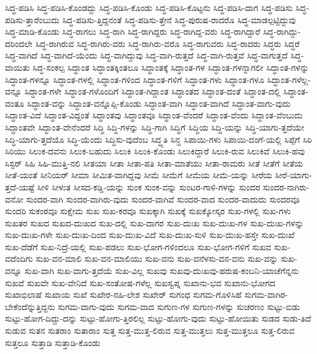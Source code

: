 {ಸಿದ್ಧ-ಪಡಿಸಿ
ಸಿದ್ಧ-ಪಡಿಸಿ-ಕೊಂಡದ್ದು
ಸಿದ್ಧ-ಪಡಿಸಿ-ಕೊಂಡು
ಸಿದ್ಧ-ಪಡಿಸಿ-ಕೊಟ್ಟನು
ಸಿದ್ಧ-ಪಡಿಸಿ-ದಾಗ
ಸಿದ್ಧ-ಪಡಿಸು
ಸಿದ್ಧ-ಪಡಿಸು-ತ್ತಾರೆಂಬುದು
ಸಿದ್ಧ-ಪಡಿಸು-ತ್ತಿದ್ದನಂತೆ
ಸಿದ್ಧ-ಪಡಿಸು-ತ್ತೇನೆ
ಸಿದ್ಧ-ಪುರುಷ-ರಾದರೊ
ಸಿದ್ಧ-ಮಾಡಲ್ಪಟ್ಟಿದ್ದುವು
ಸಿದ್ಧ-ಮಾಡಿ-ಕೊಂಡು
ಸಿದ್ಧ-ರಾಗಲು
ಸಿದ್ಧ-ರಾಗಿ
ಸಿದ್ಧ-ರಾಗಿದ್ದರು
ಸಿದ್ಧ-ರಾಗಿದ್ದ-ವರು
ಸಿದ್ಧ-ರಾಗಿದ್ದಾರೆ
ಸಿದ್ಧ-ರಾಗಿದ್ದು-ದರಿಂದಲೇ
ಸಿದ್ಧ-ರಾಗಿರುವ
ಸಿದ್ಧ-ರಾಗಿರು-ವರು
ಸಿದ್ಧ-ರಾಗಿರು-ವರೊ
ಸಿದ್ಧ-ರಾಗುವರು
ಸಿದ್ಧ-ರಾದರು
ಸಿದ್ಧರು
ಸಿದ್ಧರೆ
ಸಿದ್ಧ-ವಾಗಿದೆ
ಸಿದ್ಧ-ವಾಗಿದೆ-ಯೆಂದು
ಸಿದ್ಧ-ವಾಗಿದ್ದುವು
ಸಿದ್ಧ-ವಾಗಿ-ರುತ್ತದೆ
ಸಿದ್ಧ-ವಾಗಿ-ರುತ್ತವೆ
ಸಿದ್ಧ-ವಾಗುತ್ತದೆ
ಸಿದ್ಧ-ವಾಯಿತು
ಸಿದ್ಧ-ಸಂಕಲ್ಪ
ಸಿದ್ಧಾಂತ
ಸಿದ್ಧಾಂತಕ್ಕಿಂತಲೂ
ಸಿದ್ಧಾಂತಕ್ಕೆ
ಸಿದ್ಧಾಂತ-ಗಳ
ಸಿದ್ಧಾಂತ-ಗಳನ್ನಾಗಲೀ
ಸಿದ್ಧಾಂತ-ಗಳನ್ನು
ಸಿದ್ಧಾಂತ-ಗಳನ್ನೂ
ಸಿದ್ಧಾಂತ-ಗಳಲ್ಲಿ
ಸಿದ್ಧಾಂತ-ಗಳಿಂದ
ಸಿದ್ಧಾಂತ-ಗಳಿಗೆ
ಸಿದ್ಧಾಂತ-ಗಳು
ಸಿದ್ಧಾಂತ-ಗಳೂ
ಸಿದ್ಧಾಂತ-ಗಳೆಲ್ಲ-ವನ್ನೂ
ಸಿದ್ಧಾಂತ-ಗಳೇ
ಸಿದ್ಧಾಂತ-ಗಳೊಂದಿಗೆ
ಸಿದ್ಧಾಂತ-ಗಿದ್ದಾಂತ
ಸಿದ್ಧಾಂತದ
ಸಿದ್ಧಾಂತ-ದಂತೆ
ಸಿದ್ಧಾಂತ-ದಲ್ಲಿ
ಸಿದ್ಧಾಂತ-ವಂತೂ
ಸಿದ್ಧಾಂತ-ವನ್ನು
ಸಿದ್ಧಾಂತ-ವನ್ನೊಪ್ಪಿ-ಕೊಂಡು
ಸಿದ್ಧಾಂತ-ವಾಗಿ
ಸಿದ್ಧಾಂತ-ವಾಗಿದೆ
ಸಿದ್ಧಾಂತ-ವಾಗು-ವುದು
ಸಿದ್ಧಾಂತ-ವಿದೆ
ಸಿದ್ಧಾಂತ-ವಿದ್ದಂತೆ
ಸಿದ್ಧಾಂತವು
ಸಿದ್ಧಾಂತವೂ
ಸಿದ್ಧಾಂತ-ವೆಂದರೆ
ಸಿದ್ಧಾಂತ-ವೆಂದು
ಸಿದ್ಧಾಂತ-ವೆಂಬುದು
ಸಿದ್ಧಾಂತವೇ
ಸಿದ್ಧಾಂತ-ವೇನೆಂದರೆ
ಸಿದ್ಧಿ
ಸಿದ್ಧಿ-ಗಳನ್ನು
ಸಿದ್ಧಿ-ಗಾಗಿ
ಸಿದ್ಧಿಗೆ
ಸಿದ್ಧಿಯ
ಸಿದ್ಧಿ-ಯನ್ನು
ಸಿದ್ಧಿ-ಯಾಗು-ತ್ತದೆಯೇ
ಸಿದ್ಧಿ-ಯಾಗು-ತ್ತದೆಯೊ
ಸಿದ್ಧಿ-ಯೆಂದು
ಸಿದ್ಧಿಸು-ವುದೆಂಬ
ಸಿದ್ಧ್ಯತಿ
ಸಿನ್ಹ
ಸಿಪಾಯಿ-ಗಳು
ಸಿಪಾಯಿ-ದಂಗೆ-ಯಲ್ಲಿ
ಸಿಪ್ಪೆಗೆ
ಸಿರಿ
ಸಿರಿಯು
ಸಿಲುಕ-ದವನು
ಸಿಲುಕ-ಬಹುದು
ಸಿಲುಕಿ
ಸಿಲುಕಿ-ಕೊಂಡು
ಸಿಲುಕಿದ್ದಾರೆ
ಸಿಲುಕಿ-ರುವ
ಸಿಲುಕಿವೆ
ಸಿಲುಕಿ-ಹವು
ಸಿಸ್ಟರ್
ಸಿಹಿ
ಸಿಹಿ-ಮುತ್ತಿ-ನಲಿ
ಸೀತಯಾ
ಸೀತಾ
ಸೀತಾ-ಪತಿ
ಸೀತಾ-ಮಾತೆಯು
ಸೀತಾ-ರಾಮರು
ಸೀತೆ
ಸೀತೆಗೆ
ಸೀತೆಯ
ಸೀತೆ-ಯಂತೆ
ಸೀನಿಯರ್
ಸೀಮಾ
ಸೀಮಿತ-ವಾಗಿದ್ದವು
ಸೀಮೆ
ಸೀಮೆಗೆ
ಸೀಮೆಯ
ಸೀಮೆ-ಯನ್ನು
ಸೀರೆಯ
ಸೀರೆ-ಯಾಗು-ತ್ತದೆ-ಯಷ್ಟೆ
ಸೀಳಿ
ಸೀಳುತ
ಸೀಸದ-ಕಡ್ಡಿ-ಯನ್ನು
ಸುಂಕ
ಸುಂಕ-ವನ್ನು
ಸುಂಟರ-ಗಾಳಿ-ಗಳನ್ನು
ಸುಂದರ
ಸುಂದರ-ನಾಗಿರು-ವನೋ
ಸುಂದರ-ವಾಗಿ
ಸುಂದರ-ವಾಗಿರು-ವುದು
ಸುಂದರ-ವಾಗಿವೆ
ಸುಂದರ-ವಾದ
ಸುಂದರ-ವಾದುದು
ಸುಂದರವೂ
ಸುಂದರಿ
ಸುಕಂಠವೂ
ಸುಕ್ಷೇಮ
ಸುಖ
ಸುಖ-ಕರವೂ
ಸುಖಕ್ಕಾಗಿ
ಸುಖಕ್ಕೆ
ಸುಖಕ್ಕೋಸ್ಕರ
ಸುಖ-ಗಳಲ್ಲಿ
ಸುಖ-ಗಳು
ಸುಖತರ
ಸುಖದ
ಸುಖದ-ದುಃಖದ
ಸುಖ-ದಲ್ಲಿ
ಸುಖ-ದಾಗರ
ಸುಖ-ದುಃಖ
ಸುಖ-ದುಃಖ-ಗಳ
ಸುಖ-ದುಃಖ-ಗಳನ್ನು
ಸುಖ-ದುಃಖ-ಗಳೇ
ಸುಖ-ದುಃಖ-ದಿಂದ
ಸುಖ-ದುಃಖ-ವಿದೆ
ಸುಖ-ದುಃಖ-ಸುಳಿ
ಸುಖ-ದುಃಖ-ಹಸ್ತೇ
ಸುಖ-ದುಃಖೆ
ಸುಖ-ದೆಡೆಗೆ
ಸುಖ-ನಿದ್ರೆ-ಯಲ್ಲಿ
ಸುಖ-ಪಡಲು
ಸುಖ-ಭೋಗ-ಗಳಿಂದಲೂ
ಸುಖ-ಭೋಗ-ಗಳಿಗೆ
ಸುಖವ
ಸುಖ-ವದೆಂದಿಗು
ಸುಖ-ವನ-ಮಾಲಿ
ಸುಖ-ವನ-ಮಾಲಿಯು
ಸುಖ-ವನು
ಸುಖ-ವನೆಳಸು-ವನ-ವನು
ಸುಖ-ವನ್ನು
ಸುಖ-ವನ್ನೂ
ಸುಖ-ವಾಗಿ
ಸುಖ-ವಾಗು-ತ್ತದೆಯೆ
ಸುಖ-ವಿಲ್ಲ
ಸುಖವು
ಸುಖವು-ದುಃಖವು-ಹರುಷ-ಕಂಬನಿ-ಯಾಚೆಗೆನ್ನನು
ಸುಖವೆ
ಸುಖವೇ
ಸುಖ-ವೇನಿದೆ
ಸುಖ-ಸಂತೋಷ-ಗಳೆಲ್ಲ
ಸುಖಸ್ವಪ್ನ
ಸುಖಾನು-ಭವ
ಸುಖಾನು-ಭೋಗದ
ಸುಖಾಭಿಲಾಷೆ
ಸುಖಾಯ
ಸುಖೆ
ಸುಖೇರ-ನಹಿ-ಲೇಶ
ಸುಖೇರ್
ಸುಗಂಧ
ಸುಗಮ-ಗೊಳಿಸಿಹೆ
ಸುಗಮ-ವಾಗಿರ-ಬೇಕೆಂದೆನ್ನುತ್ತಿದ್ದನು
ಸುಗಮ-ವಾಗು-ವುದು
ಸುಗಮ-ವಾದ
ಸುಗುಣ-ಗಳ
ಸುಗುಣ-ಗಳನ್ನು
ಸುಚರಣಂ
ಸುಟ್ಟು-ಬಿಡು
ಸುಟ್ಟು-ಹೋಗ-ದಿದ್ದು-ದನ್ನು
ಸುಟ್ಟು-ಹೋಗು-ತ್ತಿರಲಿಲ್ಲ
ಸುಟ್ಟು-ಹೋಗು-ವುದು
ಸುಟ್ಟು-ಹೋಯಿತು
ಸುಡದ
ಸುಡು-ತಿದೆ
ಸುಡುವ
ಸುತನ
ಸುತರಾಂ
ಸುತಾರಾಂ
ಸುತ್ತ
ಸುತ್ತ-ಮುತ್ತ-ಲಿರುವ
ಸುತ್ತ-ಮುತ್ತಲು
ಸುತ್ತ-ಮುತ್ತಲೂ
ಸುತ್ತ-ಲಿರುವ
ಸುತ್ತಲೂ
ಸುತ್ತಾಡಿ
ಸುತ್ತಾಡಿ-ಕೊಂಡು
}
